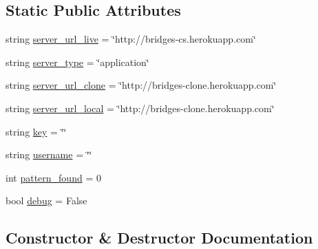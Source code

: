 \subsection*{Static Public Attributes}
\begin{DoxyCompactItemize}
\item 
string \mbox{\hyperlink{class_bridges_1_1_connector_1_1_connector_adfb859fa164c77730913a08e328c1a67}{server\+\_\+url\+\_\+live}} = \char`\"{}http\+://bridges-\/cs.\+herokuapp.\+com\char`\"{}
\item 
string \mbox{\hyperlink{class_bridges_1_1_connector_1_1_connector_ad7461a1eead38bd2ff2b6c2555f0cc61}{server\+\_\+type}} = \char`\"{}application\char`\"{}
\item 
string \mbox{\hyperlink{class_bridges_1_1_connector_1_1_connector_a394f0197f6115d051cef10ef14cab38b}{server\+\_\+url\+\_\+clone}} = \char`\"{}http\+://bridges-\/clone.\+herokuapp.\+com\char`\"{}
\item 
string \mbox{\hyperlink{class_bridges_1_1_connector_1_1_connector_ab6dc35a0ce5017ae97317360a9f69004}{server\+\_\+url\+\_\+local}} = \char`\"{}http\+://bridges-\/clone.\+herokuapp.\+com\char`\"{}
\item 
string \mbox{\hyperlink{class_bridges_1_1_connector_1_1_connector_a3828c14583f6ba624383ead558f6a991}{key}} = \char`\"{}\char`\"{}
\item 
string \mbox{\hyperlink{class_bridges_1_1_connector_1_1_connector_acebfb8bb7592210bd98c4bb42142e35b}{username}} = \char`\"{}\char`\"{}
\item 
int \mbox{\hyperlink{class_bridges_1_1_connector_1_1_connector_ace7620706cfa2b5ca62026f10f243041}{pattern\+\_\+found}} = 0
\item 
bool \mbox{\hyperlink{class_bridges_1_1_connector_1_1_connector_a64d51697f1f2864b5dfddd08546da8f6}{debug}} = False
\end{DoxyCompactItemize}


\subsection{Constructor \& Destructor Documentation}
\mbox{\label{class_bridges_1_1_connector_1_1_connector_a805cd728024ded37faace7e858418cb0}} 
